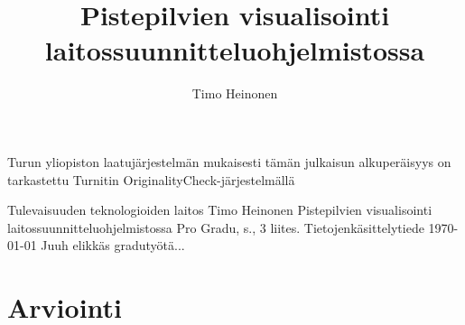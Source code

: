 \title{Pistepilvien visualisointi laitossuunnitteluohjelmistossa}
\author{Timo Heinonen}
\maketitle
\newpage
\thispagestyle{empty}
\vspace*{10cm}

\vfill

\hspace*{-2cm}\parbox{\textwidth}{Turun yliopiston laatujärjestelmän mukaisesti
  tämän julkaisun alkuperäisyys on tarkastettu Turnitin
  OriginalityCheck-järjestelmällä} 


\newpage
\begin{tiivistelma}%
        {Tulevaisuuden teknologioiden laitos}%
        {Timo Heinonen}%
        {Pistepilvien visualisointi laitossuunnitteluohjelmistossa}
        {Pro Gradu, \pageref{LastPage} s., 3 liites.}%
        {Tietojenkäsittelytiede}%
        {\today}%
	Juuh elikkäs gradutyötä...
\end{tiivistelma}

\tableofcontents %
\newpage












\section{Arviointi}\label{arviointi}

